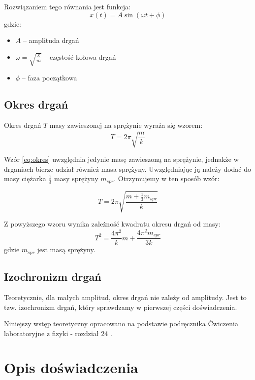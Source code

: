 \documentclass[a4paper,12pt]{article}
\begin{document}
Rozwiązaniem tego równania jest funkcja:
\begin{equation}
    x(t) = A\sin(\omega t + \phi)
\end{equation}
gdzie:
\begin{itemize}
    \setlength{\itemsep}{0em}
    \item $A$ -- amplituda drgań
    \item $\omega = \sqrt{\frac{k}{m}}$ -- częstość kołowa drgań
    \item $\phi$ -- faza początkowa
\end{itemize}

\subsection*{Okres drgań}
Okres drgań $T$ masy zawieszonej na sprężynie wyraża się wzorem:
\begin{equation}
    \label{eq:okres}
    T = 2\pi\sqrt{\frac{m}{k}}
\end{equation}

Wzór \eqref{eq:okres} uwzględnia jedynie masę zawieszoną na sprężynie, jednakże w drganiach bierze udział również masa sprężyny. Uwzględniając ją należy dodać do masy ciężarka  $\frac{1}{3}$ masy sprężyny $m_{spr}$. Otrzymujemy w ten sposób wzór:

\begin{equation}
    \label{eq:okres_spr}
    T = 2\pi\sqrt{\frac{m + \frac{1}{3}m_{spr}}{k}}
\end{equation}

Z powyższego wzoru wynika zależność kwadratu okresu drgań od masy:
\begin{equation}
    \label{eq:okres_spr_2}
    T^2 = \frac{4\pi^2}{k}m + \frac{4\pi^2m_{spr}}{3k}
\end{equation}
gdzie $m_{spr}$ jest masą sprężyny.

\subsection*{Izochronizm drgań}
Teoretycznie, dla małych amplitud, okres drgań nie zależy od amplitudy. Jest to tzw. izochronizm drgań, który sprawdzamy w pierwszej części doświadczenia.

Niniejszy wstęp teoretyczny opracowano na podstawie podręcznika Ćwiczenia laboratoryjne z fizyki - rozdział 24 \cite{Drynski1976}.

\section{Opis doświadczenia}
\end{document}
